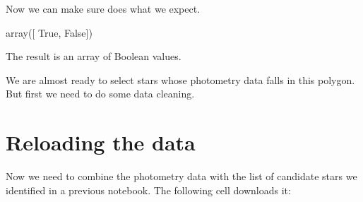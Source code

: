 \documentclass[letterpaper,10pt,english]{sphinxmanual}
\begin{document}
Now we can make sure  does what we expect.

\begin{sphinxVerbatim}[commandchars=\\\{\}]
  
\end{sphinxVerbatim}

\begin{sphinxVerbatim}[commandchars=\\\{\}]
array([ True, False])
\end{sphinxVerbatim}

The result is an array of Boolean values.

We are almost ready to select stars whose photometry data falls in this polygon.  But first we need to do some data cleaning.


\section{Reloading the data}
\label{\detokenize{06_photo:reloading-the-data}}
Now we need to combine the photometry data with the list of candidate stars we identified in a previous notebook.  The following cell downloads it:

\begin{sphinxVerbatim}[commandchars=\\\{\}]
 
   

  
  

  
\end{sphinxVerbatim}

\begin{sphinxVerbatim}[commandchars=\\\{\}]
   

   
\end{sphinxVerbatim}
\end{document}

